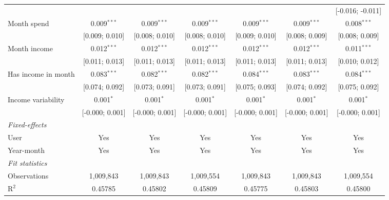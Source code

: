 \begin{table}[htbp]
\begin{threeparttable}[b]
\begin{tabular}{lcccccc}
                                        &                 &                 &                 &                  &                  & [-0.016; -0.011]\\   
         Month spend                    & 0.009$^{***}$   & 0.009$^{***}$   & 0.009$^{***}$   & 0.009$^{***}$    & 0.009$^{***}$    & 0.008$^{***}$\\   
                                        & [0.009; 0.010]  & [0.008; 0.010]  & [0.008; 0.010]  & [0.009; 0.010]   & [0.008; 0.009]   & [0.008; 0.009]\\   
         Month income                   & 0.012$^{***}$   & 0.012$^{***}$   & 0.012$^{***}$   & 0.012$^{***}$    & 0.012$^{***}$    & 0.011$^{***}$\\   
                                        & [0.011; 0.013]  & [0.011; 0.013]  & [0.011; 0.013]  & [0.011; 0.013]   & [0.011; 0.013]   & [0.010; 0.012]\\   
         Has income in month            & 0.083$^{***}$   & 0.082$^{***}$   & 0.082$^{***}$   & 0.084$^{***}$    & 0.083$^{***}$    & 0.084$^{***}$\\   
                                        & [0.074; 0.092]  & [0.073; 0.091]  & [0.073; 0.091]  & [0.075; 0.093]   & [0.074; 0.092]   & [0.075; 0.092]\\   
         Income variability             & 0.001$^{*}$     & 0.001$^{*}$     & 0.001$^{*}$     & 0.001$^{*}$      & 0.001$^{*}$      & 0.001$^{*}$\\   
                                        & [-0.000; 0.001] & [-0.000; 0.001] & [-0.000; 0.001] & [-0.000; 0.001]  & [-0.000; 0.001]  & [-0.000; 0.001]\\   
         \midrule
         \emph{Fixed-effects}\\
         User                           & Yes             & Yes             & Yes             & Yes              & Yes              & Yes\\  
         Year-month                     & Yes             & Yes             & Yes             & Yes              & Yes              & Yes\\  
         \midrule
         \emph{Fit statistics}\\
         Observations                   & 1,009,843       & 1,009,843       & 1,009,554       & 1,009,843        & 1,009,843        & 1,009,554\\  
         R$^2$                          & 0.45785         & 0.45802         & 0.45809         & 0.45775          & 0.45803          & 0.45800\\  

\end{tabular}
\end{threeparttable}
\end{table}
